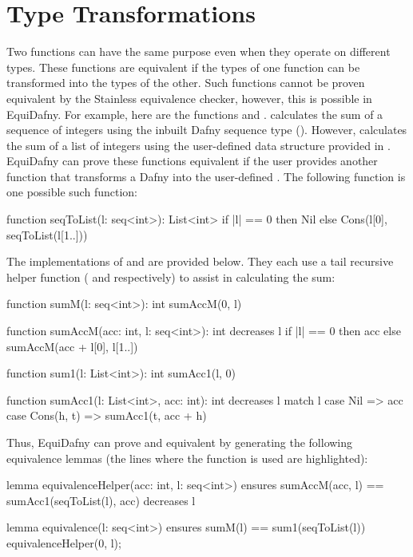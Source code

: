\section{Type Transformations}\label{sec:type-transformations}

Two functions can have the same purpose even when they operate on different types. These functions are equivalent if the types of one function can be transformed into the types of the other. Such functions cannot be proven equivalent by the Stainless equivalence checker, however, this is possible in EquiDafny. For example, here are the functions  and .  calculates the sum of a sequence of integers using the inbuilt Dafny sequence type (). However,  calculates the sum of a list of integers using the user-defined  data structure provided in . EquiDafny can prove these functions equivalent if the user provides another function that transforms a Dafny  into the user-defined . The following function  is one possible such function:
\begin{dafny}
function seqToList(l: seq<int>): List<int> {
    if |l| == 0 then Nil
    else Cons(l[0], seqToList(l[1..]))
}
\end{dafny}
% 
The implementations of  and  are provided below. They each use a tail recursive helper function ( and  respectively) to assist in calculating the sum:
\begin{dafny}
function sumM(l: seq<int>): int {
    sumAccM(0, l)
}

function sumAccM(acc: int, l: seq<int>): int
    decreases l
{
    if |l| == 0 then acc
    else sumAccM(acc + l[0], l[1..])
}

function sum1(l: List<int>): int {
    sumAcc1(l, 0)
}

function sumAcc1(l: List<int>, acc: int): int
    decreases l
{
    match l {
        case Nil => acc
        case Cons(h, t) => sumAcc1(t, acc + h)
    }
}
\end{dafny}
% 
Thus, EquiDafny can prove  and  equivalent by generating the following equivalence lemmas (the lines where the  function is used are highlighted):
\begin{dafny}[highlightlines={2,7}]
lemma equivalenceHelper(acc: int, l: seq<int>)
  ensures sumAccM(acc, l) == sumAcc1(seqToList(l), acc)
  decreases l
{}

lemma equivalence(l: seq<int>)
  ensures sumM(l) == sum1(seqToList(l))
{
    equivalenceHelper(0, l);
}
\end{dafny}
